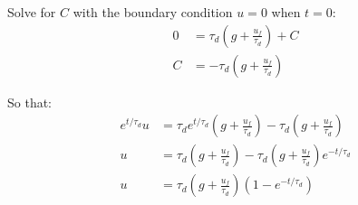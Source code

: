 \documentclass[../Interim_Report_Master]{subfiles}
\begin{document}
Solve for $C$ with the boundary condition $u=0$ when $t=0$:
\begin{subequations}
	\begin{align}
	0 &= \tau_d\left(g + \frac{u_f}{\tau_d}\right) + C \\
	C &= -\tau_d\left(g + \frac{u_f}{\tau_d}\right) 
	\end{align}
\end{subequations}

So that:
\begin{subequations}
	\begin{align}
	e^{t/\tau_d}u &= \tau_de^{t/\tau_d}\left(g + \frac{u_f}{\tau_d}\right) - \tau_d\left(g + \frac{u_f}{\tau_d}\right) \\
	u &= \tau_d\left(g + \frac{u_f}{\tau_d}\right) - \tau_d\left(g + \frac{u_f}{\tau_d}\right)e^{-t/\tau_d} \\
	u &= \tau_d\left(g + \frac{u_f}{\tau_d}\right)(1-e^{-t/\tau_d})
	\end{align}
\end{subequations}
\end{document}
